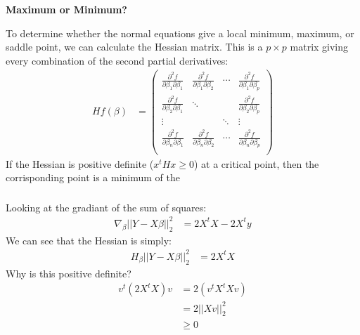 \begin{frame}[fragile] \frametitle{}

{\bf Maximum or Minimum?}

To determine whether the normal equations give a local minimum, maximum, or
saddle point, we can calculate the Hessian matrix.
\pause This is a $p \times p$ matrix giving every combination of the
second partial derivatives:
\begin{align*}
H f(\beta) &=
  \left(\begin{array}{cccc}\frac{\partial^2f}{\partial \beta_1 \partial \beta_1}&\frac{\partial^2f}{\partial \beta_1 \partial \beta_2}&\cdots&\frac{\partial^2f}{\partial \beta_1 \partial \beta_p}\\
                           \frac{\partial^2f}{\partial \beta_2 \partial \beta_1}&\ddots&&\frac{\partial^2f}{\partial \beta_2 \partial \beta_p}\\
                           \vdots&&\ddots&\vdots\\
                           \frac{\partial^2f}{\partial \beta_n \partial \beta_1}&\frac{\partial^2f}{\partial \beta_n \partial \beta_2}&\cdots&\frac{\partial^2f}{\partial \beta_n \partial \beta_p}\\\end{array}\right)
\end{align*}
If the Hessian is positive definite ($x^t H x \geq 0$) at a critical point,
then the corrisponding point is a minimum of the

\end{frame}

\begin{frame}[fragile] \frametitle{}

Looking at the gradiant of the sum of squares:
\begin{align*}
\nabla_\beta ||Y - X \beta ||_2^2 &= 2 X^t X - 2 X^t y
\end{align*}
\pause We can see that the Hessian is simply:
\begin{align*}
H_\beta ||Y - X \beta ||_2^2 &= 2 X^t X
\end{align*}
\pause Why is this positive definite? \pause
\begin{align*}
v^t \left(2 X^tX \right) v &= 2 \left( v^t X^t X v\right) \\
&= 2 || X v ||_2^2 \\
&\geq 0
\end{align*}

\end{frame}

